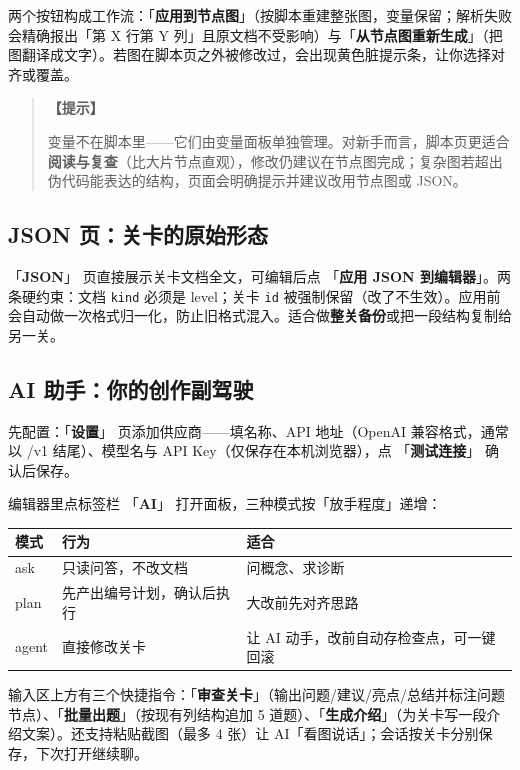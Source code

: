 \documentclass[UTF8,a4paper,zihao=-4]{ctexart}
\newcommand{\code}[1]{\texttt{#1}}   %
\newcommand{\ui}[1]{「\textbf{#1}」}  %
\newenvironment{tip}[1][提示]{%
  \begin{quote}\small\textbf{【#1】}\ignorespaces
}{\end{quote}}
\begin{document}
两个按钮构成工作流：\ui{应用到节点图}（按脚本重建整张图，变量保留；解析失败会精确报出「第 X 行第 Y 列」且原文档不受影响）与\ui{从节点图重新生成}（把图翻译成文字）。若图在脚本页之外被修改过，会出现黄色脏提示条，让你选择对齐或覆盖。

\begin{tip}
变量不在脚本里——它们由变量面板单独管理。对新手而言，脚本页更适合\textbf{阅读与复查}（比大片节点直观），修改仍建议在节点图完成；复杂图若超出伪代码能表达的结构，页面会明确提示并建议改用节点图或 JSON。
\end{tip}

\subsection{JSON 页：关卡的原始形态}

\ui{JSON} 页直接展示关卡文档全文，可编辑后点 \ui{应用 JSON 到编辑器}。两条硬约束：文档 \code{kind} 必须是 level；关卡 \code{id} 被强制保留（改了不生效）。应用前会自动做一次格式归一化，防止旧格式混入。适合做\textbf{整关备份}或把一段结构复制给另一关。

\subsection{AI 助手：你的创作副驾驶}

先配置：\ui{设置} 页添加供应商——填名称、API 地址（OpenAI 兼容格式，通常以 /v1 结尾）、模型名与 API Key（仅保存在本机浏览器），点 \ui{测试连接} 确认后保存。

编辑器里点标签栏 \ui{AI} 打开面板，三种模式按「放手程度」递增：

\begin{center}
\begin{tabular}{lll}
\toprule
模式 & 行为 & 适合 \\
\midrule
ask & 只读问答，不改文档 & 问概念、求诊断 \\
plan & 先产出编号计划，确认后执行 & 大改前先对齐思路 \\
agent & 直接修改关卡 & 让 AI 动手，改前自动存检查点，可一键回滚 \\
\bottomrule
\end{tabular}
\end{center}

输入区上方有三个快捷指令：\ui{审查关卡}（输出问题/建议/亮点/总结并标注问题节点）、\ui{批量出题}（按现有列结构追加 5 道题）、\ui{生成介绍}（为关卡写一段介绍文案）。还支持粘贴截图（最多 4 张）让 AI「看图说话」；会话按关卡分别保存，下次打开继续聊。
\end{document}

